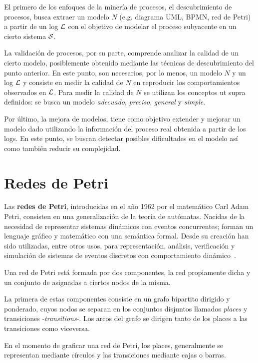 El primero de los enfoques de la minería de procesos, el descubrimiento de procesos, busca extraer un modelo $N$
(e.g. diagrama UML, BPMN, red de Petri) a partir de un log ${\mathcal L}$ con el objetivo de modelar
el proceso subyacente en un cierto sistema $\mathcal{S}$. 

La validación de procesos, por su parte, comprende analizar la calidad de un cierto modelo,
posiblemente obtenido mediante las técnicas de descubrimiento del punto anterior. En este punto, 
son necesarios, por lo menos, un modelo $N$ y un log ${\mathcal L}$ y consiste en medir la calidad 
de $N$ en reproducir los comportamientos observados en ${\mathcal L}$. Para medir la calidad de $N$ se 
utilizan los conceptos ut supra definidos:
se busca un modelo \emph{adecuado}, \emph{preciso}, \emph{general} y \emph{simple}.

Por último, la mejora de modelos, tiene como objetivo extender y mejorar un modelo dado utilizando la información
del proceso real obtenida a partir de los logs. En este punto, se buscan detectar posibles dificultades en 
el modelo así como también reducir su complejidad.


\section{Redes de Petri}
\label{sec:2.Petrinets}
Las \textbf{redes de Petri}, introducidas en el año 1962 por el matemático
Carl Adam Petri, consisten en una generalización de la teoría de autómatas.
Nacidas de la necesidad de representar sistemas dinámicos con eventos concurrentes;
forman un lenguaje gráfico y matemático con una semántica formal.
Desde su creación han sido utilizadas, entre otros usos, para representación,
análisis, verificación y simulación de sistemas de eventos discretos con 
comportamiento dinámico~\cite{Murata89}.

Una red de Petri está formada por dos componentes, la red propiamente dicha y un conjunto
de  asignadas a ciertos nodos de la misma.

La primera de estas componentes consiste en un grafo bipartito dirigido y ponderado,
cuyos nodos se separan en los conjuntos disjuntos 
llamados \textit{places} y transiciones -\textit{transitions}-.
Los arcos del grafo se dirigen tanto de los places a las transiciones como viceversa.

En el momento de graficar una red de Petri, los places, generalmente se
representan mediante círculos y las transiciones mediante cajas o barras.

